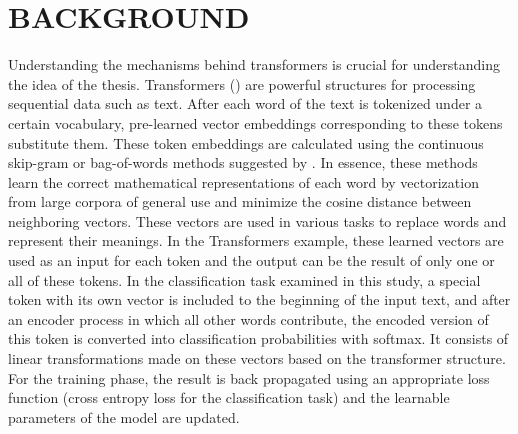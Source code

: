 \documentclass{iyte}
\begin{document}
\chapter{BACKGROUND}

Understanding the mechanisms behind transformers is crucial for understanding the idea of the thesis. Transformers (\citealt{attention_is_all_you_need}) are powerful structures for processing sequential data such as text. After each word of the text is tokenized under a certain vocabulary, pre-learned vector embeddings corresponding to these tokens substitute them. These token embeddings are calculated using the continuous skip-gram or bag-of-words methods suggested by \cite{word2vec}. In essence, these methods learn the correct mathematical representations of each word by vectorization  from large corpora of general use and minimize the cosine distance between neighboring vectors. These vectors are used in various tasks to replace words and represent their meanings. In the Transformers example, these learned vectors are used as an input for each token and the output can be the result of only one or all of these tokens. In the classification task examined in this study, a special token with its own vector is included to the beginning of the input text, and after an encoder process in which all other words contribute, the encoded version of this token is converted into classification probabilities with softmax. It consists of linear transformations made on these vectors based on the transformer structure. For the training phase, the result is back propagated using an appropriate loss function (cross entropy loss for the classification task) and the learnable parameters of the model are updated.
\end{document}
